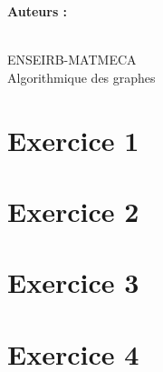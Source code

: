 \documentclass[a4paper,12pt]{article}
\title{\texteTitre}
\author{\texteAuteurs}
\date{\texteDate}
\begin{document}


\hypersetup{pageanchor=false}
\begin{titlepage}
    \centering

    \vspace*{1.5cm}

    {\Huge\bfseries \texteNumero\par}

    \vspace{0.8cm}

    {\LARGE \texteTitre \par}

    \vspace{7cm}

    {\Large
    \textbf{Auteurs :}\\
    \texteAuteurs\par}

    \vfill

    {\large
    \texteDate\\
    ENSEIRB-MATMECA\\
    Algorithmique des graphes
    \par}

    \vspace{1cm}

\end{titlepage}
\hypersetup{pageanchor=true} %


\section{Exercice 1}

\newpage
\section{Exercice 2}

\newpage
\section{Exercice 3}

\newpage
\section{Exercice 4}

\end{document}
